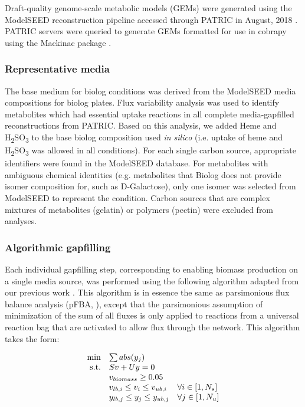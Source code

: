 \documentclass[11pt,twocolumn,notitlepage,openany,twoside]{book}
\begin{document}
\begin{refsection}
Draft-quality genome-scale metabolic models (GEMs) were generated using the ModelSEED reconstruction pipeline \cite{Henry2010-um} accessed through PATRIC in August, 2018 \cite{Wattam2017-tk}. PATRIC servers were queried to generate GEMs formatted for use in cobrapy \cite{Ebrahim2013-eb} using the Mackinac package \cite{Mundy2017-eb}.

\subsubsection{Representative media}

The base medium for biolog conditions was derived from the ModelSEED media compositions for biolog plates. Flux variability analysis was used to identify metabolites which had essential uptake reactions in all complete media-gapfilled reconstructions from PATRIC. Based on this analysis, we added Heme and H\textsubscript{2}SO\textsubscript{3} to the base biolog composition used \textit{in silico} (i.e. uptake of heme and H\textsubscript{2}SO\textsubscript{3} was allowed in all conditions). For each single carbon source, appropriate identifiers were found in the ModelSEED database. For metabolites with ambiguous chemical identities (e.g. metabolites that Biolog does not provide isomer composition for, such as D-Galactose), only one isomer was selected from ModelSEED to represent the condition. Carbon sources that are complex mixtures of metabolites (gelatin) or polymers (pectin) were excluded from analyses.

\subsubsection{Algorithmic gapfilling}

Each individual gapfilling step, corresponding to enabling biomass production on a single media source, was performed using the following algorithm adapted from our previous work \cite{Biggs2017-md}. This algorithm is in essence the same as parsimonious flux balance analysis (pFBA, \cite{Lewis2010-xs}), except that the parsimonious assumption of minimization of the sum of all fluxes is only applied to reactions from a universal reaction bag that are activated to allow flux through the network. This algorithm takes the form:

\begin{equation*}
\begin{array}{rlll}
\min & \multicolumn{2}{l} {\sum abs(y_j) } \\
\textrm{s.t.} &	Sv + Uy = 0	 \\
&	v_{biomass} \geq 0.05 \\
&	v_{lb,i} \leq v_i \leq v_{ub,i}	& 	\forall i \in [1, N_s] \\
&	y_{lb,j} \leq y_j \leq y_{ub,j}	&	\forall j \in [1, N_u] \\
\end{array}
\end{equation*}


\end{refsection}
\end{document}
